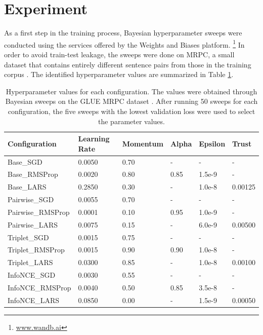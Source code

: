 \documentclass[11pt]{article}
\begin{document}
\section{Experiment}
\label{sec:experiment}
As a first step in the training process, Bayesian hyperparameter sweeps were conducted using the services offered by the Weights and Biases platform.%
\footnote{\url{www.wandb.ai}}
In order to avoid train-test leakage, the sweeps were done on MRPC, a small dataset that contains entirely different sentence pairs from those in the training corpus \cite{dolan:2005}.
The identified hyperparameter values are summarized in Table \ref{tab:hyperparam}.\\
\begin{table}[!tbp]
\centering
\begin{tabular}{llllll}
\hline
\textbf{Configuration} & \textbf{Learning Rate} & \textbf{Momentum} & \textbf{Alpha} & \textbf{Epsilon} & \textbf{Trust}\\
\hline
Base\_SGD           & 0.0050 & 0.70 &    - &      - & -\\
Base\_RMSProp       & 0.0020 & 0.80 & 0.85 & 1.5e-9 & -\\
Base\_LARS          & 0.2850 & 0.30 &    - & 1.0e-8 & 0.00125\\
Pairwise\_SGD       & 0.0055 & 0.70 &    - &      - & -\\
Pairwise\_RMSProp   & 0.0001 & 0.10 & 0.95 & 1.0e-9 & -\\
Pairwise\_LARS      & 0.0075 & 0.15 &    - & 6.0e-9 & 0.00500\\
Triplet\_SGD        & 0.0015 & 0.75 &    - &      - & -\\
Triplet\_RMSProp    & 0.0015 & 0.90 & 0.90 & 1.0e-8 & -\\
Triplet\_LARS       & 0.0300 & 0.85 &    - & 1.0e-8 & 0.00100\\
InfoNCE\_SGD        & 0.0030 & 0.55 &    - &      - & -\\
InfoNCE\_RMSProp    & 0.0040 & 0.50 & 0.85 & 3.5e-8 & -\\
InfoNCE\_LARS       & 0.0850 & 0.00 &    - & 1.5e-9 & 0.00050\\
\hline
\end{tabular}
\caption{\label{tab:hyperparam}
Hyperparameter values for each configuration.
The values were obtained through Bayesian sweeps on the GLUE MRPC dataset \cite{dolan:2005, wang:2018}. After running 50 sweeps for each configuration, the five sweeps with the lowest validation loss were used to select the parameter values.  
}
\end{table}
\end{document}
